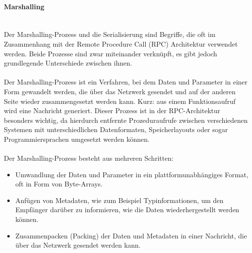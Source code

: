 \documentclass[../vs-script-first-v01.tex]{subfiles}
\begin{document}
\paragraph{Marshalling\\\\}
Der Marshalling-Prozess und die Serialisierung sind Begriffe, die oft im Zusammenhang mit der Remote Procedure Call (RPC) Architektur verwendet werden. Beide Prozesse sind zwar miteinander verknüpft, es gibt jedoch grundlegende Unterschiede zwischen ihnen.
\\\\
Der Marshalling-Prozess ist ein Verfahren, bei dem Daten und Parameter in einer Form gewandelt werden, die über das Netzwerk gesendet und auf der anderen Seite wieder zusammengesetzt werden kann. Kurz: aus einem Funktionsaufruf wird eine Nachricht generiert. Dieser Prozess ist in der RPC-Architektur besonders wichtig, da hierdurch entfernte Prozeduraufrufe zwischen verschiedenen Systemen mit unterschiedlichen Datenformaten, Speicherlayouts oder sogar Programmiersprachen umgesetzt werden können.
\\\\
Der Marshalling-Prozess besteht aus mehreren Schritten:
\begin{itemize} 
\item Umwandlung der Daten und Parameter in ein plattformunabhängiges Format, oft in Form von Byte-Arrays.
\item Anfügen von Metadaten, wie zum Beispiel Typinformationen, um den Empfänger darüber zu informieren, wie die Daten wiederhergestellt werden können.
\item Zusammenpacken (Packing) der Daten und Metadaten in einer Nachricht, die über das Netzwerk gesendet werden kann.
\end{itemize} 
\end{document}
